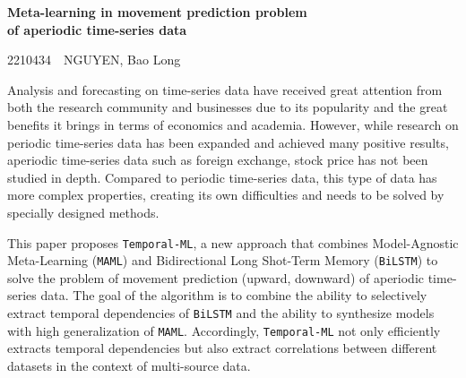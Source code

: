 \documentclass[12pt,a4paper]{article}
\begin{document}
\begin{center}
    \large\bfseries Meta-learning in movement prediction problem\\of aperiodic time-series data
\end{center}

\begin{flushright}
2210434~~NGUYEN, Bao Long
\end{flushright}


Analysis and forecasting on time-series data have received great attention from both the research community and businesses due to its popularity and the great benefits it brings in terms of economics and academia. However, while research on periodic time-series data has been expanded and achieved many positive results, aperiodic time-series data such as foreign exchange, stock price has not been studied in depth. Compared to periodic time-series data, this type of data has more complex properties, creating its own difficulties and needs to be solved by specially designed methods.


This paper proposes \verb|Temporal-ML|, a new approach that combines Model-Agnostic Meta-Learning (\verb|MAML|) and Bidirectional Long Shot-Term Memory (\verb|BiLSTM|) to solve the problem of movement prediction (upward, downward) of aperiodic time-series data. The goal of the algorithm is to combine the ability to selectively extract temporal dependencies of \verb|BiLSTM| and the ability to synthesize models with high generalization of \verb|MAML|. Accordingly, \verb|Temporal-ML| not only efficiently extracts temporal dependencies but also extract correlations between different datasets in the context of multi-source data.
\end{document}
